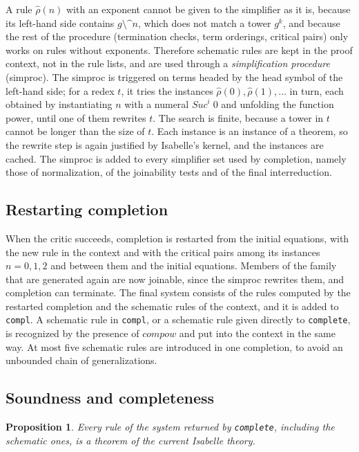 \documentclass[preprint,12pt]{elsarticle}
\newtheorem{proposition}{Proposition}
\newcommand{\pw}[2]{#1^{#2}}               %
\newcommand{\pp}{\mathbin{\texttt{\^{}\^{}}}}     %
\newcommand{\isa}[1]{\texttt{#1}}
\newcommand{\Suc}{\mathit{Suc}}
\begin{document}
A rule $\hat\rho(n)$ with an exponent cannot be given to the simplifier as
it is, because its left-hand side contains $g \pp n$,
which does not match a tower $\pw{g}{k}$, and because the rest of the
procedure (termination checks, term orderings, critical pairs) only works
on rules without exponents. Therefore schematic rules are kept in the proof context,
not in the rule lists, and are used through a \emph{simplification
procedure} (simproc). The simproc is triggered on terms headed by the head
symbol of the left-hand side; for a redex $t$, it tries the instances
$\hat\rho(0), \hat\rho(1), \ldots$ in turn, each obtained by instantiating
$n$ with a numeral $\Suc^i\;0$ and unfolding the function power, until one
of them rewrites $t$. The search is finite, because a tower in $t$ cannot be
longer than the size of $t$. Each instance is an instance of a theorem, so
the rewrite step is again justified by Isabelle's kernel, and the instances
are cached. The simproc is added to every simplifier set used by
completion, namely those of normalization, of the joinability tests and of
the final interreduction.

\subsection{Restarting completion}

When the critic succeeds, completion is restarted from the initial
equations, with the new rule in the context and with the critical pairs
among its instances $n = 0, 1, 2$ and between them and the initial
equations. Members of the family that are generated again are now
joinable, since the simproc rewrites them, and completion can terminate.
The final system consists of the rules computed by the restarted
completion and the schematic rules of the context, and it is added to
\isa{compl}. A schematic rule in \isa{compl}, or a schematic rule given
directly to \isa{complete}, is recognized by the presence of
$\mathit{compow}$ and put into the context in the same way. At most five
schematic rules are introduced in one completion, to avoid an unbounded
chain of generalizations.

\subsection{Soundness and completeness}

\begin{proposition}
Every rule of the system returned by \isa{complete}, including the
schematic ones, is a theorem of the current Isabelle theory.
\end{proposition}
\end{document}
